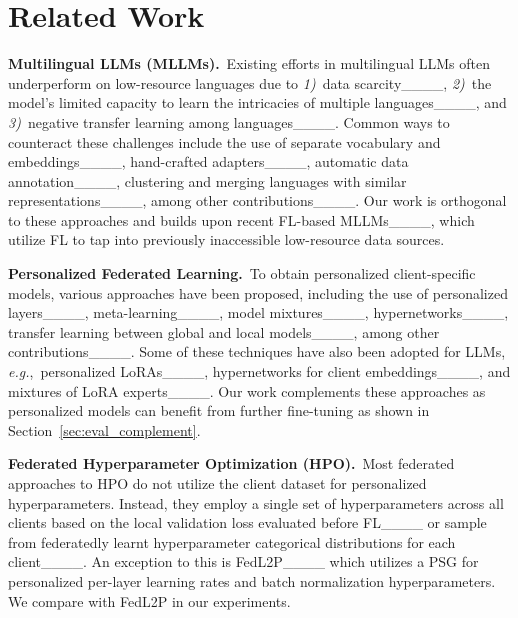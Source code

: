 \section{Related Work}
\label{sec:related}

\noindent\textbf{Multilingual LLMs (MLLMs).}~Existing efforts in multilingual LLMs often underperform on low-resource languages due to \textit{1)}~data scarcity____, \textit{2)}~the model's limited capacity to learn the intricacies of multiple languages____, and \textit{3)}~negative transfer learning among languages____.
Common ways to counteract these challenges include the use of separate vocabulary and embeddings____, hand-crafted adapters____, automatic data annotation____, clustering and merging languages with similar representations____, among other contributions____. Our work is orthogonal to these approaches and builds upon recent FL-based MLLMs____, which utilize FL to tap into previously inaccessible low-resource data sources.

\noindent\textbf{Personalized Federated Learning.}~To obtain personalized client-specific models, various approaches have been proposed, including the use of personalized layers____, meta-learning____, model mixtures____, hypernetworks____, transfer learning between global and local models____, among other contributions____. Some of these techniques have also been adopted for LLMs, \textit{e.g.},~personalized LoRAs____, hypernetworks for client embeddings____, and mixtures of LoRA experts____. Our work complements these approaches as personalized models can benefit from further fine-tuning as shown in Section~\ref{sec:eval_complement}.

\noindent\textbf{Federated Hyperparameter Optimization (HPO).}~Most federated approaches to HPO do not utilize the client dataset for personalized hyperparameters. Instead, they employ a single set of hyperparameters across all clients based on the local validation loss evaluated before FL____ or sample from federatedly learnt hyperparameter categorical distributions for each client____. An exception to this is FedL2P____ which utilizes a PSG for personalized per-layer learning rates and batch normalization hyperparameters. We compare with FedL2P in our experiments.

